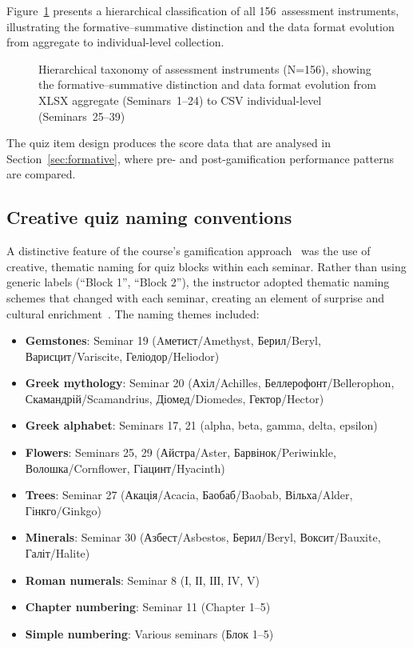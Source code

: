 Figure~\ref{fig:assessment-taxonomy} presents a hierarchical classification of all 156~assessment instruments, illustrating the formative--summative distinction and the data format evolution from aggregate to individual-level collection.

\begin{figure}[!h]
\centering
\resizebox{\textwidth}{!}{}
\caption{Hierarchical taxonomy of assessment instruments (N=156), showing the formative--summative distinction and data format evolution from XLSX aggregate (Seminars~1--24) to CSV individual-level (Seminars~25--39)}
\label{fig:assessment-taxonomy}
\end{figure}

The quiz item design produces the score data that are analysed in Section~\ref{sec:formative}, where pre- and post-gamification performance patterns are compared.

\subsection{Creative quiz naming conventions} \label{sec:quiz-naming}

A distinctive feature of the course's gamification approach~\cite{Deterding2011, KoivistoHamari2019} was the use of creative, thematic naming for quiz blocks within each seminar. Rather than using generic labels (``Block 1'', ``Block 2''), the instructor adopted thematic naming schemes that changed with each seminar, creating an element of surprise and cultural enrichment~\cite{Sailer2017}. The naming themes included:

\begin{itemize}
\item \textbf{Gemstones}: Seminar 19 (Aметист/Amethyst, Берил/Beryl, Варисцит/Variscite, Геліодор/Heliodor)
\item \textbf{Greek mythology}: Seminar 20 (Ахіл/Achilles, Беллерофонт/Bellerophon, Скамандрій/Scamandrius, Діомед/Diomedes, Гектор/Hector)
\item \textbf{Greek alphabet}: Seminars 17, 21 (alpha, beta, gamma, delta, epsilon)
\item \textbf{Flowers}: Seminars 25, 29 (Айстра/Aster, Барвінок/Periwinkle, Волошка/Cornflower, Гіацинт/Hyacinth)
\item \textbf{Trees}: Seminar 27 (Акація/Acacia, Баобаб/Baobab, Вільха/Alder, Гінкго/Ginkgo)
\item \textbf{Minerals}: Seminar 30 (Азбест/Asbestos, Берил/Beryl, Воксит/Bauxite, Галіт/Halite)
\item \textbf{Roman numerals}: Seminar 8 (І, ІІ, ІІІ, IV, V)
\item \textbf{Chapter numbering}: Seminar 11 (Chapter 1--5)
\item \textbf{Simple numbering}: Various seminars (Блок 1--5)
\end{itemize}

